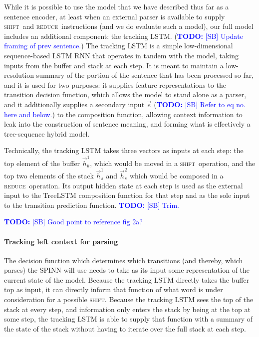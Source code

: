 \documentclass[11pt]{article}
\newcommand\todo[1]{\textcolor{blue}{\textbf{TODO:} #1}}
\newcommand{\shift}{\textsc{shift}}
\newcommand{\reduce}{\textsc{reduce}}
\begin{document}
While it is possible to use the model that we have described thus far as a sentence encoder, at least when an external parser is available to supply \shift~and \reduce~instructions (and we do evaluate such a model), our full model includes an additional component: the tracking LSTM. (\todo{[SB] Update framing of prev sentence.}) The tracking LSTM is a simple low-dimensional sequence-based LSTM RNN that operates in tandem with the model, taking inputs from the buffer and stack at each step. It is meant to maintain a low-resolution summary of the portion of the sentence that has been processed so far, and it is used for two purposes: it supplies feature representations to the transition decision function, which allows the model to stand alone as a parser, and it additionally supplies a secondary input $\vec{e}$ (\todo{[SB] Refer to eq no. here and below.}) to the composition function, allowing context information to leak into the construction of sentence meaning, and forming what is effectively a tree-sequence hybrid model.

Technically, the tracking LSTM takes three vectors as inputs at each step: the top element of the buffer $\vec{h}_b^1$, which would be moved in a \shift~operation, and the top two elements of the stack $\vec{h}_s^1$ and $\vec{h}_s^2$ which would be composed in a \reduce~operation. Its output hidden state at each step is used as the external input to the TreeLSTM composition function for that step and as the sole input to the transition prediction function. \todo{[SB] Trim.}

\todo{[SB] Good point to reference fig 2a?}

\paragraph{Tracking left context for parsing} The decision function which determines which transitions (and thereby, which parses) the SPINN will use needs to take as its input some representation of the current state of the model. Because the tracking LSTM directly takes the buffer top as input, it can directly inform that function of what word is under consideration for a possible \shift. Because the tracking LSTM sees the top of the stack at every step, and information only enters the stack by being at the top at some step, the tracking LSTM is able to supply that function with a summary of the state of the stack without having to iterate over the full stack at each step.
\end{document}
